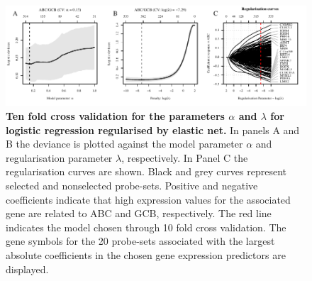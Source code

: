 \documentclass[10pt]{bmc_article}
\newenvironment{bmcformat}{\fussy\setboolean{publ}{true}}{\fussy}
\begin{document}
\begin{bmcformat}
{
  }     %



\setcounter{figure}{0}
\setcounter{table}{0}
\begin{figure}[htb]
\begin{center}
\includegraphics[width=1\textwidth]{CrosvalidationClass.pdf}
\end{center}
\caption{\textbf{Ten fold cross validation for the parameters $\alpha$ and $\lambda$ for logistic regression regularised by elastic net.} In panels A and B the deviance is plotted against the model parameter $\alpha$ and regularisation parameter $\lambda$, respectively. In Panel C the regularisation curves are shown. Black and grey curves represent selected and nonselected probe-sets. Positive and negative coefficients indicate that high expression values for the associated gene are related to ABC and GCB, respectively. The red line indicates the model chosen through 10 fold cross validation. The gene symbols for the 20 probe-sets associated with the largest absolute coefficients in the chosen gene expression predictors are displayed.}
\label{fig:crossval}
\end{figure}


\end{bmcformat}
\end{document}
